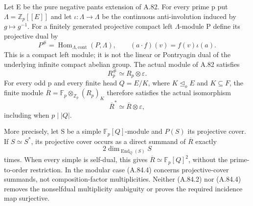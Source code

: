 Let E be the pure negative pants extension of A.82. For every prime p
put \(\Lambda=\mathbb Z_p[[E]]\) and let
\(\iota:\Lambda\longrightarrow\Lambda\) be the continuous
anti-involution induced by \(g\mapsto g^{-1}\). For a finitely generated
projective compact left \(\Lambda\)-module P define its projective dual by
\[
 P^\#=\operatorname{Hom}_{\Lambda,\mathrm{cont}}(P,\Lambda),
 \qquad (a\cdot f)(v)=f(v)\iota(a).
 \tag{A.84.1}
\]
This is a compact left module; it is not the linear or Pontryagin dual
of the underlying infinite compact abelian group. The actual module of
A.82 satisfies
\[
                         R_p^\#\simeq R_p\otimes\varepsilon.
 \tag{A.84.2}
\]
For every odd p and every finite head \(Q=E/K\), where
\(K\trianglelefteq_o E\) and \(K\subseteq F\), the finite module
\(\overline R=\mathbb F_p\otimes_{\mathbb Z_p}(R_p)_K\)
therefore satisfies the actual isomorphism
\[
                         \overline R^*\simeq
                                    \overline R\otimes\varepsilon,
 \tag{A.84.3}
\]
including when \(p\mid |Q|\).

More precisely, let S be a simple \(\mathbb F_p[Q]\)-module and
\(P(S)\) its projective cover. If \(S\simeq S^*\), its projective
cover occurs as a direct summand of \(\overline R\) exactly
\[
                          2\dim_{\operatorname{End}_Q(S)}S
 \tag{A.84.4}
\]
times. When every simple is self-dual, this gives
\(\overline R\simeq\mathbb F_p[Q]^2\), without the
prime-to-order restriction. In the modular case (A.84.4) concerns
projective-cover summands, not composition-factor multiplicities.
Neither (A.84.2) nor (A.84.4) removes the nonselfdual multiplicity
ambiguity or proves the required incidence map surjective.

